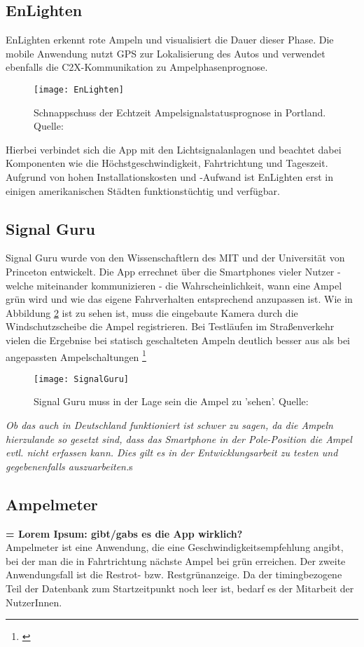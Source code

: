 \subsection{EnLighten}
EnLighten erkennt rote Ampeln und visualisiert die Dauer dieser Phase. Die mobile Anwendung nutzt \gls{GPS} zur Lokalisierung des Autos und verwendet ebenfalls die \gls{C2X}-Kommunikation zu Ampelphasenprognose.
\begin{figure}[H]
    \centering
    \texttt{[image: EnLighten]}
    \label{fig:Ampelsignalstatus}
    \caption[EnLighten]{Schnappschuss der Echtzeit Ampelsignalstatusprognose in Portland. Quelle: \cite{EnLighten}}
\end{figure}
Hierbei verbindet sich die App mit den Lichtsignalanlagen und beachtet dabei Komponenten wie die Höchstgeschwindigkeit, Fahrtrichtung und Tageszeit. Aufgrund von hohen Installationskosten und -Aufwand ist EnLighten erst in einigen amerikanischen Städten funktionstüchtig und verfügbar.
\subsection{Signal Guru}
Signal Guru wurde von den Wissenschaftlern des \gls{MIT} und der Universität von Princeton entwickelt. Die App errechnet über die Smartphones vieler Nutzer - welche miteinander kommunizieren -  die Wahrscheinlichkeit, wann eine Ampel grün wird und wie das eigene Fahrverhalten entsprechend anzupassen ist. Wie in Abbildung \ref{fig:AppSignalGuru} ist zu sehen ist, muss die eingebaute Kamera durch die Windschutzscheibe die Ampel registrieren. Bei Testläufen im Straßenverkehr vielen die Ergebnise bei statisch geschalteten Ampeln deutlich besser aus als bei angepassten Ampelschaltungen \footnote{\cite{SignalGuru}} 
\begin{figure}[H]
    \centering
    \texttt{[image: SignalGuru]}
    \caption[Signal Guru]{Signal Guru muss in der Lage sein die Ampel zu 'sehen'.  Quelle: \cite{SignalGuruPaper}}
    \label{fig:AppSignalGuru}
\end{figure}
\textit{Ob das auch in Deutschland funktioniert ist schwer zu sagen, da die Ampeln hierzulande so gesetzt sind, dass das Smartphone in der Pole-Position die Ampel evtl. nicht erfassen kann. Dies gilt es in der Entwicklungsarbeit zu testen und gegebenenfalls auszuarbeiten.}s
\subsection{Ampelmeter}
\textbf{= Lorem Ipsum: gibt/gabs es die App wirklich? \\}
Ampelmeter ist eine Anwendung, die eine Geschwindigkeitsempfehlung angibt, bei der man die in Fahrtrichtung nächste Ampel bei grün erreichen. Der zweite Anwendungsfall ist die Restrot- bzw. Restgrünanzeige. Da der timingbezogene Teil der Datenbank zum Startzeitpunkt noch leer ist, bedarf es der Mitarbeit der NutzerInnen.

